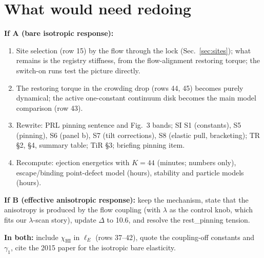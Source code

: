 \documentclass[11pt,a4paper]{article}
\begin{document}
\section{What would need redoing}
\textbf{If A (bare isotropic response):}
\begin{enumerate}
\item Site selection (row 15) by the flow through the lock (Sec.~\ref{sec:sites}); what remains is the registry stiffness, from the flow-alignment
restoring torque; the switch-on runs test the picture directly.
\item The restoring torque in the crowding drop (rows 44, 45) becomes purely dynamical; the active one-constant continuum disk becomes the main model
comparison (row 43).
\item Rewrite: PRL pinning sentence and Fig.~3 bands; SI S1 (constants), S5 (pinning), S6 (panel b), S7 (tilt corrections), S8 (elastic pull,
bracketing); TR \S2, \S4, summary table; TiR \S3; briefing pinning item.
\item Recompute: ejection energetics with $K=44$ (minutes; numbers only), escape/binding point-defect model (hours), stability and particle models (hours).
\end{enumerate}
\textbf{If B (effective anisotropic response):} keep the mechanism, state that the anisotropy is produced by the flow coupling (with $\lambda$ as the
control knob, which fits our $\lambda$-scan story), update $\Delta$ to 10.6, and resolve the rest\_pinning tension.

\textbf{In both:} include $\chi_\mathrm{HI}$ in $\ell_E$ (rows 37--42), quote the coupling-off constants and $\gamma_1$, cite the 2015 paper for the
isotropic bare elasticity.
\end{document}
